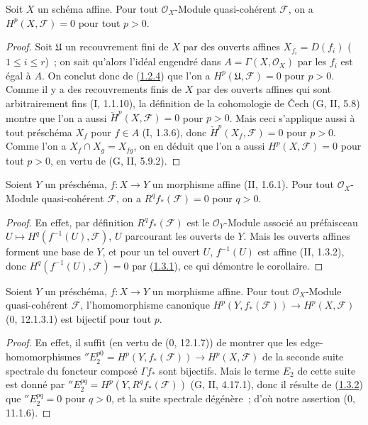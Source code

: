 \begin{theorem}[1.3.1]
\label{III.1.3.1-fr}
Soit $X$ un schéma affine. Pour tout $\mathcal O_X$-Module quasi-cohérent
$\mathcal F$, on a $H^p(X,\mathcal F)=0$ pour tout $p>0$.
\end{theorem}

\begin{proof}
Soit $\mathfrak U$ un recouvrement fini de $X$ par des ouverts affines
$X_{f_i}=D(f_i)$ ($1\leq i\leq r$)~; on sait qu'alors l'idéal engendré dans
$A=\Gamma(X,\mathcal O_X)$ par les $f_i$ est égal à $A$. On conclut donc de
(\hyperref[III.1.2.4-fr]{1.2.4}) que l'on a
$H^p(\mathfrak U,\mathcal F)=0$ pour $p>0$. Comme il y a des recouvrements
finis de $X$ par des ouverts affines qui sont arbitrairement fins (I, 1.1.10),
la définition de la cohomologie de Čech (G, II, 5.8) montre que l'on a aussi
$\check H^p(X,\mathcal F)=0$ pour $p>0$. Mais ceci s'applique aussi à tout
préschéma $X_f$ pour $f\in A$ (I, 1.3.6), donc
$\check H^p(X_f,\mathcal F)=0$ pour $p>0$. Comme l'on a
$X_f\cap X_g=X_{fg}$, on en déduit que l'on a aussi
$H^p(X,\mathcal F)=0$ pour tout $p>0$, en vertu de (G, II, 5.9.2).
\end{proof}

\begin{corollary}[1.3.2]
\label{III.1.3.2-fr}
Soient $Y$ un préschéma, $f:X\to Y$ un morphisme affine (II, 1.6.1). Pour
tout $\mathcal O_X$-Module quasi-cohérent $\mathcal F$, on a
$R^qf_*(\mathcal F)=0$ pour $q>0$.
\end{corollary}

\begin{proof}
En effet, par définition $R^qf_*(\mathcal F)$ est le $\mathcal O_Y$-Module
associé au préfaisceau $U\mapsto H^q(f^{-1}(U),\mathcal F)$, $U$ parcourant
les ouverts de $Y$. Mais les ouverts affines forment une base de $Y$, et pour
un tel ouvert $U$, $f^{-1}(U)$ est affine (II, 1.3.2), donc
$H^q(f^{-1}(U),\mathcal F)=0$ par
(\hyperref[III.1.3.1-fr]{1.3.1}), ce qui démontre le corollaire.
\end{proof}

\begin{corollary}[1.3.3]
\label{III.1.3.3-fr}
Soient $Y$ un préschéma, $f:X\to Y$ un morphisme affine. Pour tout
$\mathcal O_X$-Module quasi-cohérent $\mathcal F$, l'homomorphisme canonique
$H^p(Y,f_*(\mathcal F))\to H^p(X,\mathcal F)$ (0, 12.1.3.1) est bijectif
pour tout $p$.
\end{corollary}

\begin{proof}
En effet, il suffit (en vertu de (0, 12.1.7)) de montrer que les
edge-homomorphismes
$''E_2^{p0}=H^p(Y,f_*(\mathcal F))\to H^p(X,\mathcal F)$ de la seconde suite
spectrale du foncteur composé $\Gamma f_*$ sont bijectifs. Mais le terme
$E_2$ de cette suite est donné par
$''E_2^{pq}=H^p(Y,R^qf_*(\mathcal F))$ (G, II, 4.17.1), donc il résulte de
(\hyperref[III.1.3.2-fr]{1.3.2}) que $''E_2^{pq}=0$ pour $q>0$, et la suite
spectrale dégénère~; d'où notre assertion (0, 11.1.6).
\end{proof}

